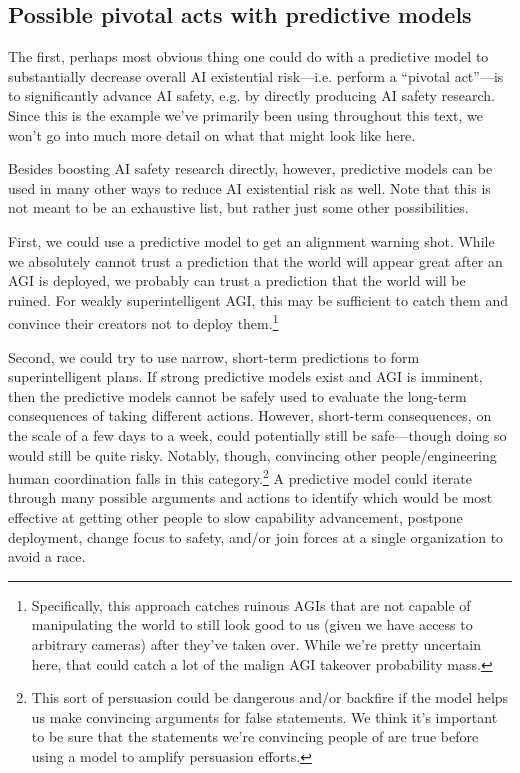 {{\subsection{Possible pivotal acts with predictive models}

The first, perhaps most obvious thing one could do with a predictive model to substantially decrease overall AI existential risk---i.e. perform a ``pivotal act''---is to significantly advance AI safety, e.g. by directly producing AI safety research. Since this is the example we've primarily been using throughout this text, we won't go into much more detail on what that might look like here.

Besides boosting AI safety research directly, however, predictive models can be used in many other ways to reduce AI existential risk as well. Note that this is not meant to be an exhaustive list, but rather just some other possibilities.

First, we could use a predictive model to get an alignment warning shot. While we absolutely cannot trust a prediction that the world will appear great after an AGI is deployed, we probably can trust a prediction that the world will be ruined. For weakly superintelligent AGI, this may be sufficient to catch them and convince their creators not to deploy them.\footnote{Specifically, this approach catches ruinous AGIs that are not capable of manipulating the world to still look good to us (given we have access to arbitrary cameras) after they've taken over. While we're pretty uncertain here, that could catch a lot of the malign AGI takeover probability mass.}

Second, we could try to use narrow, short-term predictions to form superintelligent plans. If strong predictive models exist and AGI is imminent, then the predictive models cannot be safely used to evaluate the long-term consequences of taking different actions. However, short-term consequences, on the scale of a few days to a week, could potentially still be safe---though doing so would still be quite risky. Notably, though, convincing other people/engineering human coordination falls in this category.\footnote{This sort of persuasion could be dangerous and/or backfire if the model helps us make convincing arguments for false statements. We think it's important to be sure that the statements we're convincing people of are true before using a model to amplify persuasion efforts.} A predictive model could iterate through many possible arguments and actions to identify which would be most effective at getting other people to slow capability advancement, postpone deployment, change focus to safety, and/or join forces at a single organization to avoid a race.

}}
